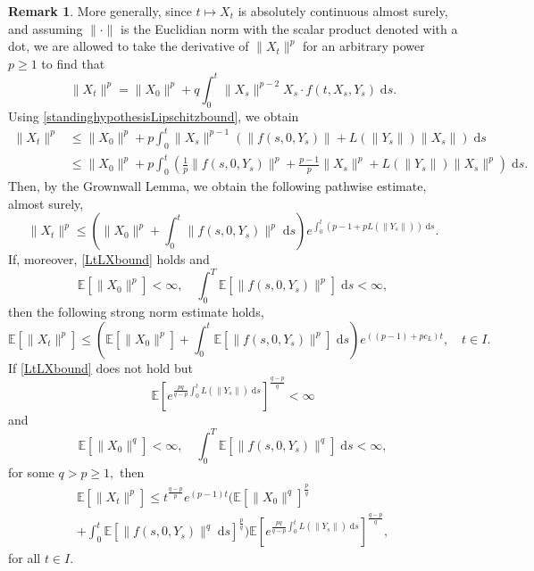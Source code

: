 \documentclass[reqno,12pt]{amsart}
\theoremstyle{plain} %
\theoremstyle{definition} %
\newtheorem{remark}{Remark}[section]
\begin{document}
\begin{remark}
    More generally, since $t\mapsto X_t$ is absolutely continuous almost surely, and assuming $\|\cdot\|$ is the Euclidian norm with the scalar product denoted with a dot, we are allowed to take the derivative of $\|X_t\|^p$ for an arbitrary power $p \geq 1$ to find that
    \[
        \|X_t\|^p = \|X_0\|^p + q\int_0^t \|X_s\|^{p-2}X_s \cdot f(t, X_s, Y_s)\;\mathrm{d}s.
    \]
    Using \eqref{standinghypothesisLipschitzbound}, we obtain
    \begin{align*}
        \|X_t\|^p & \leq \|X_0\|^p + p\int_0^t \|X_s\|^{p-1} \left(\|f(s, 0, Y_s)\| + L(\|Y_s\|) \|X_s\|\right)\;\mathrm{d}s \\
        & \leq \|X_0\|^p + p\int_0^t \left(\frac{1}{p}\|f(s, 0, Y_s)\|^p + \frac{p-1}{p}\|X_s\|^p + L(\|Y_s\|) \|X_s\|^p\right)\;\mathrm{d}s.
    \end{align*}
    Then, by the Grownwall Lemma, we obtain the following pathwise estimate, almost surely,
    \begin{equation}
        \label{XtboundLXMtbeta}
        \|X_t\|^p \leq \left(\|X_0\|^p + \int_0^t \|f(s, 0, Y_s)\|^p \;\mathrm{d}s\right) e^{\int_0^t \left(p - 1 + p L(\|Y_s\|)\right) \;\mathrm{d}s}.
    \end{equation}
    If, moreover, \eqref{LtLXbound} holds and 
    \begin{equation}
        \label{EX0Mtstrongboundbeta}
        \mathbb{E}[\|X_0\|^p] < \infty, \quad
        \int_0^T \mathbb{E}[\|f(s, 0, Y_s)\|^p] \;\mathrm{d}s < \infty,
    \end{equation}
    then the following strong norm estimate holds,
    \begin{equation}
        \label{EXtstrongboundbeta}
        \mathbb{E}[\|X_t\|^p] \leq \left(\mathbb{E}[\|X_0\|^p] + \int_0^t \mathbb{E}[\|f(s, 0, Y_s)\|^p]\;\mathrm{d}s\right) e^{((p - 1) + p c_L) t}, \quad t\in I.
    \end{equation}
    If \eqref{LtLXbound} does not hold but
    \begin{equation}
        \label{EexpintLptilde}
        \mathbb{E}\left[e^{\frac{pq}{q - p}\int_0^t L(\|Y_s\|)\;\mathrm{d}s}\right]^{\frac{q - p}{q}} < \infty
    \end{equation}
    and
    \begin{equation}
        \label{EX0Mtstrongboundptilde}
        \mathbb{E}[\|X_0\|^{q}] < \infty, \quad
        \int_0^T \mathbb{E}[\|f(s, 0, Y_s)\|^{q}] \;\mathrm{d}s < \infty,
    \end{equation}
    for some $q > p \geq 1,$ then
    \begin{multline}
        \label{EXtstrongboundbetaptilde}
        \mathbb{E}[\|X_t\|^p] \leq t^{\frac{q- p}{p}}e^{(p - 1)t}\Bigg(\mathbb{E}[\|X_0\|^{q}]^{\frac{p}{q}} \\ + \int_0^t \mathbb{E}[\|f(s, 0, Y_s)\|^{q} \;\mathrm{d}s]^{\frac{p}{q}}\Bigg) \mathbb{E}\left[e^{\frac{pq}{q - p}\int_0^t L(\|Y_s\|)\;\mathrm{d}s}\right]^{\frac{q - p}{q}},
    \end{multline}
    for all $t\in I.$
\end{remark}
\end{document}
